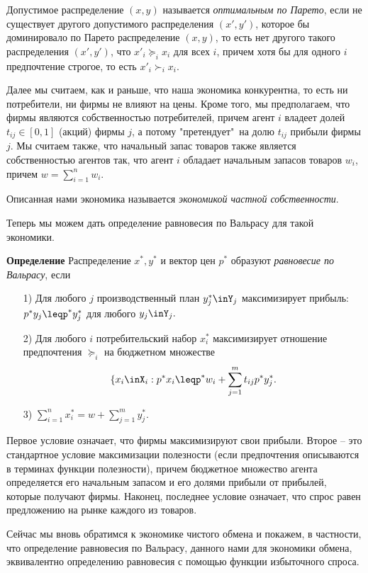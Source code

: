 Допустимое распределение $(x,y)$ называется \emph{оптимальным по Парето},
если не существует другого допустимого распределения $(x\prime,y\prime)$, которое бы
доминировало по Парето распределение $(x,y)$, то есть нет другого такого распределения
$(x\prime,y\prime)$, что $x\prime_i\succeq_ix_i$ для всех $i$, причем хотя бы для одного
$i$ предпочтение строгое, то есть $x\prime_i\succ_ix_i$.

Далее мы считаем, как и раньше, что наша экономика конкурентна, то есть
ни потребители, ни фирмы не влияют на цены. Кроме того, мы предполагаем, что фирмы
являются собственностью потребителей, причем агент $i$ владеет долей $t_{ij}\in[0,1]$ (акций)
фирмы $j$, а потому "претендует"\, на долю $t_{ij}$ прибыли фирмы $j$. Мы считаем также,
что начальный запас товаров также является собственностью агентов так, что агент $i$
обладает начальным запасов товаров $w_i$, причем $w=\sum^n_{i=1}w_i$.

Описанная нами экономика называется \emph{экономикой частной собственности}.

Теперь мы можем дать определение равновесия по Вальрасу для такой экономики.

\textbf{Определение} Распределение $x^*,y^*$ и вектор цен $p^*$ образуют \emph{равновесие
по Вальрасу}, если

\begin{itemize}
\item[1)] Для любого $j$ производственный план $y^*_j\inY_j$ максимизирует прибыль:
$p^*y_j\leqp^*y^*_j$ для любого $y_j\inY_j.$
\item[2)] Для любого $i$ потребительский набор $x^*_i$ максимизирует отношение предпочтения
$\succeq_i$ на бюджетном множестве
$$\{x_i\inX_i: p^*x_i\leqp^*w_i+\sum^m_{j=1}t_{ij}p^*y^*_j.$$
\item[3)] $\sum^n_{i=1}x^*_i=w+\sum^m_{j=1}y^*_j.$
\end{itemize}

Первое условие означает, что фирмы максимизируют свои прибыли. Второе -- это стандартное условие
максимизации полезности (если предпочтения описываются в терминах функции полезности), причем
бюджетное множество агента определяется его начальным запасом и его долями прибыли от прибылей,
которые получают фирмы. Наконец, последнее условие означает, что спрос равен предложению
на рынке каждого из товаров.

Сейчас мы вновь обратимся к экономике чистого обмена и покажем, в частности, что определение
равновесия по Вальрасу, данного нами  для экономики обмена, эквивалентно определению
равновесия с помощью функции избыточного спроса.

